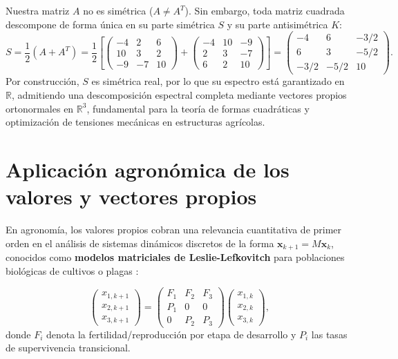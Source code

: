 \documentclass[spanish,letterpaper,oneside]{article}
\begin{document}
Nuestra matriz $A$ no es simétrica ($A \neq A^T$). Sin embargo, toda matriz cuadrada descompone de forma única en su parte simétrica $S$ y su parte antisimétrica $K$:
\begin{equation}
S = \frac{1}{2}(A + A^T) = \frac{1}{2}\left[\begin{pmatrix} -4 & 2 & 6 \\ 10 & 3 & 2 \\ -9 & -7 & 10 \end{pmatrix} + \begin{pmatrix} -4 & 10 & -9 \\ 2 & 3 & -7 \\ 6 & 2 & 10 \end{pmatrix}\right] =
\begin{pmatrix} -4 & 6 & -3/2 \\ 6 & 3 & -5/2 \\ -3/2 & -5/2 & 10 \end{pmatrix}.
\end{equation}
Por construcción, $S$ es simétrica real, por lo que su espectro está garantizado en $\mathbb{R}$, admitiendo una descomposición espectral completa mediante vectores propios ortonormales en $\mathbb{R}^3$, fundamental para la teoría de formas cuadráticas y optimización de tensiones mecánicas en estructuras agrícolas.

\section{Aplicación agronómica de los valores y vectores propios}

En agronomía, los valores propios cobran una relevancia cuantitativa de primer orden en el análisis de sistemas dinámicos discretos de la forma $\mathbf{x}_{k+1} = M \mathbf{x}_k$, conocidos como \textbf{modelos matriciales de Leslie-Lefkovitch} para poblaciones biológicas de cultivos o plagas \citep{leslie1945,caswell2001}:

\begin{equation}
\begin{pmatrix} x_{1, k+1} \\ x_{2, k+1} \\ x_{3, k+1} \end{pmatrix} =
\begin{pmatrix}
F_1 & F_2 & F_3 \\
P_1 & 0 & 0 \\
0 & P_2 & P_3
\end{pmatrix}
\begin{pmatrix} x_{1, k} \\ x_{2, k} \\ x_{3, k} \end{pmatrix},
\end{equation}
donde $F_i$ denota la fertilidad/reproducción por etapa de desarrollo y $P_i$ las tasas de supervivencia transicional.
\end{document}
